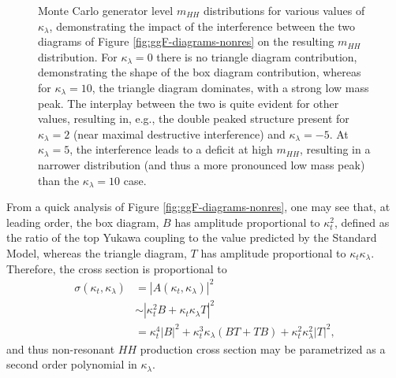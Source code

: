 \begin{figure}[ht]
\centering
{}
\caption{\label{fig:kl-shapes} Monte Carlo generator level $m_{HH}$ distributions for various values of 
$\kappa_{\lambda}$, demonstrating the impact of the interference between the two diagrams of Figure \ref{fig:ggF-diagrams-nonres} 
on the resulting $m_{HH}$ distribution. For $\kappa_{\lambda} = 0$ there is no triangle diagram contribution, 
demonstrating the shape of the box diagram contribution, whereas for $\kappa_{\lambda}=10$, the triangle diagram 
dominates, with a strong low mass peak. The interplay between the two is quite evident for other values, resulting in, 
e.g., the double peaked structure present for $\kappa_{\lambda} = 2$ (near maximal destructive interference) and $\kappa_{\lambda}=-5$. At $\kappa_{\lambda}=5$, the interference leads to a deficit at high $m_{HH}$, resulting in a narrower distribution (and thus a more pronounced low mass peak) than the $\kappa_{\lambda}=10$ case. ~\cite{HDBS-2018-58}}
\end{figure}

From a quick analysis of Figure \ref{fig:ggF-diagrams-nonres}, one may see that, at leading order, the box diagram, $B$ 
has amplitude proportional to $\kappa_{t}^2$, defined as the ratio of the top Yukawa coupling to the value 
predicted by the Standard Model, whereas the triangle diagram, $T$ has amplitude proportional to 
$\kappa_{t}\kappa_{\lambda}$. Therefore, the cross section is proportional to 
\begin{align}
\sigma(\kappa_{t}, \kappa_{\lambda}) &= |A(\kappa_{t}, \kappa_{\lambda})|^2 \\
&\sim |\kappa_{t}^2B +\kappa_{t}\kappa_{\lambda}T|^2\\
&= \kappa_{t}^4|B|^2 + \kappa_{t}^3\kappa_{\lambda}(BT+TB) + \kappa_{t}^2\kappa_{\lambda}^2|T|^2,
\end{align} 
and thus non-resonant $HH$ production cross section may be parametrized as a second order 
polynomial in $\kappa_{\lambda}$.

